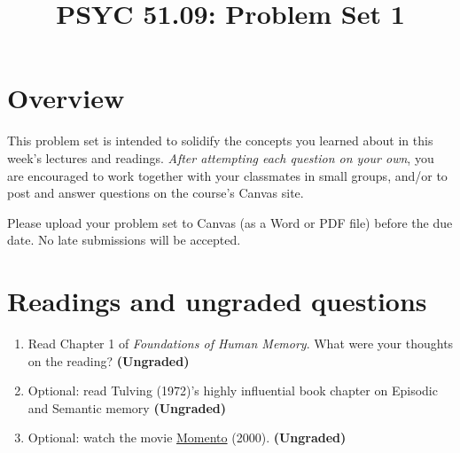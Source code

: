 \documentclass[11pt]{article}
\title{PSYC 51.09: Problem Set 1}
\date{}
\begin{document}
\maketitle
\vspace{-0.75in}
\section*{Overview}
This problem set is intended to solidify the concepts you learned
about in this week's lectures and readings.  \textit{After attempting
each question on your own}, you are encouraged
to work together with your classmates in small groups, and/or to post
and answer questions on the course’s Canvas site.

Please upload your problem set to Canvas (as a Word or PDF file)
before the due date.  No late submissions will be accepted.

\section*{Readings and ungraded questions}
\begin{enumerate}
\item Read Chapter 1 of \textit{Foundations of Human Memory}.  What were your thoughts on the reading?
  \textbf{(Ungraded)}

\item Optional: read Tulving (1972)'s highly influential book chapter
  on Episodic and Semantic memory
  \textbf{(Ungraded)}

\item Optional: watch the movie \underline{Momento} (2000).  \textbf{(Ungraded)}
\end{enumerate}
\end{document}
